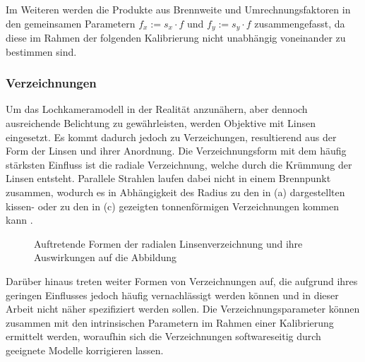Im Weiteren werden die Produkte aus Brennweite und Umrechnungsfaktoren in den gemeinsamen Parametern $f_x := s_x \cdot f$ und $f_y := s_y \cdot f$ zusammengefasst, da diese im Rahmen der folgenden Kalibrierung nicht unabhängig voneinander zu bestimmen sind.

\subsubsection{Verzeichnungen}
Um das Lochkameramodell in der Realität anzunähern, aber dennoch ausreichende Belichtung zu gewährleisten, werden Objektive mit Linsen eingesetzt. Es kommt dadurch jedoch zu Verzeichungen, resultierend aus der Form der Linsen und ihrer Anordnung. Die Verzeichnungsform mit dem häufig stärksten Einfluss ist die radiale Verzeichnung, welche durch die Krümmung der Linsen entsteht. Parallele Strahlen laufen dabei nicht in einem Brennpunkt zusammen, wodurch es in Abhängigkeit des Radius zu den in  (a) dargestellten kissen- oder zu den in  (c) gezeigten tonnenförmigen Verzeichnungen kommen kann \cite{Hertzberg2012}.


\begin{figure}[!ht]
	\begin{center}
	\hspace{4mm}
	\hspace{4mm}
	\caption{Auftretende Formen der radialen Linsenverzeichnung und ihre Auswirkungen auf die Abbildung}
	\label{fig.distortions}
	\end{center}
\end{figure}


Darüber hinaus treten weiter Formen von Verzeichnungen auf, die aufgrund ihres geringen Einflusses jedoch häufig vernachlässigt werden können und in dieser Arbeit nicht näher spezifiziert werden sollen. Die Verzeichnungsparameter können zusammen mit den intrinsischen Parametern im Rahmen einer Kalibrierung ermittelt werden, woraufhin sich die Verzeichnungen softwareseitig durch geeignete Modelle korrigieren lassen. 


